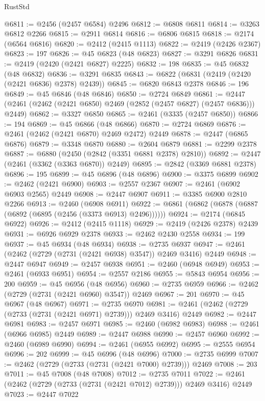 \begin{lexlean}{RustStd}
\begin{coremodule}
@6811 := @2456 (@2457 @6584) @2496
@6812 := @6808 @6811
@6814 := @3263 @6812 @2266
@6815 := @2911 @6814
@6816 := @6806 @6815
@6818 := @2174 (@6564 @6816)
@6820 := @2412 (@2415 @1113)
@6822 := @2419 (@2426 @2367)
@6823 := 197
@6826 := @45 @6823 (@48 @6823)
@6827 := @3291 @6826
@6831 := @2419 (@2420 (@2421 @6827) @2225)
@6832 := 198
@6835 := @45 @6832 (@48 @6832)
@6836 := @3291 @6835
@6843 := @6822 (@6831 (@2419 (@2420 (@2421 @6836) @2378) @2439))
@6845 := @6820 @6843 @2378
@6846 := 196
@6849 := @45 @6846 (@48 @6846)
@6850 := @2724 @6849
@6861 := @2447 (@2461 (@2462 (@2421 @6850) @2469 (@2852 (@2457 @6827) (@2457 @6836))) @2449)
@6862 := @3327 @6850
@6865 := @2461 (@3335 (@2457 @6850))
@6866 := 194
@6869 := @45 @6866 (@48 @6866)
@6870 := @2724 @6869
@6876 := @2461 (@2462 (@2421 @6870) @2469 @2472) @2449
@6878 := @2447 (@6865 @6876)
@6879 := @3348 @6870
@6880 := @2604 @6879
@6881 := @2299 @2378
@6887 := @6880 (@2450 (@2842 (@3351 @6881 @2378) @2810))
@6892 := @2447 (@2461 (@3362 (@3363 @6870)) @2449)
@6895 := @2842 (@3369 @6881 @2378)
@6896 := 195
@6899 := @45 @6896 (@48 @6896)
@6900 := @3375 @6899
@6902 := @2462 (@2421 @6900)
@6903 := @2557 @2367
@6907 := @2461 (@6902 @6903 @2565) @2449
@6908 := @2447 @6907
@6911 := @3385 @6900 @2810 @2266
@6913 := @2460 (@6908 @6911)
@6922 := @6861 (@6862 (@6878 (@6887 (@6892 (@6895 (@2456 (@3373 @6913) @2496))))))
@6924 := @2174 (@6845 @6922)
@6926 := @2412 (@2415 @1118)
@6929 := @2419 (@2426 @2378) @2439
@6931 := @6926 @6929 @2378
@6933 := @2462 @2430 @2558
@6934 := 199
@6937 := @45 @6934 (@48 @6934)
@6938 := @2735 @6937
@6947 := @2461 (@2462 (@2729 (@2731 (@2421 @6938) @3547)) @2469 @3416) @2449
@6948 := @2447 @6947
@6949 := @2457 @6938
@6951 := @2460 (@6948 @6949)
@6953 := @2461 (@6933 @6951)
@6954 := @2557 @2186
@6955 := @5843 @6954
@6956 := 200
@6959 := @45 @6956 (@48 @6956)
@6960 := @2735 @6959
@6966 := @2462 (@2729 (@2731 (@2421 @6960) @3547)) @2469
@6967 := 201
@6970 := @45 @6967 (@48 @6967)
@6971 := @2735 @6970
@6981 := @2461 (@2462 (@2729 (@2733 (@2731 (@2421 @6971) @2739))) @2469 @3416) @2449
@6982 := @2447 @6981
@6983 := @2457 @6971
@6985 := @2460 (@6982 @6983)
@6988 := @2461 (@6966 @6985) @2449
@6989 := @2447 @6988
@6990 := @2457 @6960
@6992 := @2460 (@6989 @6990)
@6994 := @2461 (@6955 @6992)
@6995 := @2555 @6954
@6996 := 202
@6999 := @45 @6996 (@48 @6996)
@7000 := @2735 @6999
@7007 := @2462 (@2729 (@2733 (@2731 (@2421 @7000) @2739))) @2469
@7008 := 203
@7011 := @45 @7008 (@48 @7008)
@7012 := @2735 @7011
@7022 := @2461 (@2462 (@2729 (@2733 (@2731 (@2421 @7012) @2739))) @2469 @3416) @2449
@7023 := @2447 @7022

\end{coremodule}
\end{lexlean}
